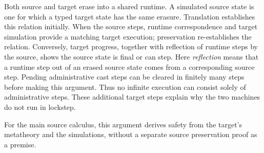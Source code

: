 Both source and target erase into a shared runtime. A simulated source
state is one for which a typed target state has the same erasure.
Translation establishes this relation initially. When the source steps,
runtime correspondence and target simulation provide a matching target
execution; preservation re-establishes the relation.
Conversely, target progress, together with reflection of runtime steps
by the source, shows the source state is final or can step.
Here \emph{reflection} means that a runtime step out of an erased source
state comes from a corresponding source step. Pending administrative
cast steps can be cleared in finitely many steps before making this
argument. Thus no infinite execution can consist solely of administrative
steps. These additional target steps explain
why the two machines do not run in lockstep.


For the main source calculus, this argument derives safety from the
target's metatheory and the simulations, without a separate source
preservation proof as a premise.

